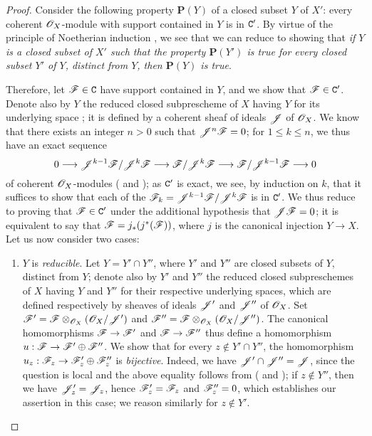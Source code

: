 \begin{proof}
\label{proof-3.3.1.2}
Consider the following property $\textbf{P}(Y)$ of a closed subset $Y$ of $X'$: every coherent $\mathscr{O}_X$-module with support contained in $Y$ is in $\mathtt{C}'$.
By virtue of the principle of Noetherian induction , we see that we can reduce to showing that \emph{if $Y$ is a closed subset of $X'$ such that the property $\textbf{P}(Y')$ is true for every closed subset $Y'$ of $Y$, distinct from $Y$, then $\textbf{P}(Y)$ is true}.

Therefore, let $\mathscr{F}\in\mathtt{C}$ have support contained in $Y$, and we show that $\mathscr{F}\in\mathtt{C}'$.
Denote also by $Y$ the reduced closed subprescheme of $X$ having $Y$ for its underlying space ; it is defined by a coherent sheaf of ideals $\mathscr{J}$ of $\mathscr{O}_X$.
We know  that there exists an integer $n>0$ such that $\mathscr{J}^n\mathscr{F}=0$; for $1\leq k\leq n$, we thus have an exact sequence
\[
  0\to\sh{J}^{k-1}\sh{F}/\sh{J}^k\sh{F}\to\sh{F}/\sh{J}^k\sh{F}\to\sh{F}/\sh{J}^{k-1}\sh{F}\to 0
\]
 of coherent $\mathscr{O}_X$-modules ( and ); as $\mathtt{C}'$ is exact, we see, by induction on $k$, that it suffices to show that each of the $\mathscr{F}_k=\mathscr{J}^{k-1}\mathscr{F}/\mathscr{J}^k\mathscr{F}$ is in $\mathtt{C}'$.
We thus reduce to proving that $\mathscr{F}\in\mathtt{C}'$ under the additional hypothesis that $\mathscr{J}\mathscr{F}=0$; it is equivalent to say that $\mathscr{F}=j_*(j^*(\mathscr{F}))$, where $j$ is the canonical injection $Y\to X$.
Let us now consider two cases:
\begin{enumerate}[label=(\alph*)]
  \item $Y$ is \emph{reducible}.
    Let $Y=Y'\cap Y''$, where $Y'$ and $Y''$ are closed subsets of $Y$, distinct from $Y$; denote also by $Y'$ and $Y''$ the reduced closed subpreschemes of $X$ having $Y$ and $Y''$ for their respective underlying spaces, which are defined respectively by sheaves of ideals $\mathscr{J}'$ and $\mathscr{J}''$ of $\mathscr{O}_X$.
    Set $\mathscr{F}'=\mathscr{F}\otimes_{\mathscr{O}_X}(\mathscr{O}_X/\mathscr{J}')$ and $\mathscr{F}''=\mathscr{F}\otimes_{\mathscr{O}_X}(\mathscr{O}_X/\mathscr{J}'')$.
    The canonical homomorphisms $\sh{F}\to\sh{F}'$ and $\sh{F}\to\sh{F}''$ thus define a homomorphism $u:\sh{F}\to\sh{F}'\oplus\sh{F}''$.
    We show that for every $z\not\in Y'\cap Y''$, the homomorphism $u_z:\sh{F}_z\to\sh{F}_z'\oplus\sh{F}_z''$ is \emph{bijective}.
    Indeed, we have $\mathscr{J}'\cap\mathscr{J}''=\mathscr{J}$, since the question is local and
    the above equality follows from ( and ); if $z\not\in Y''$, then we have $\mathscr{J}_z'=\mathscr{J}_z$, hence $\mathscr{F}_z'=\mathscr{F}_z$ and $\mathscr{F}_z''=0$, which establishes our assertion in this case; we reason similarly for $z\not\in Y'$.

\end{enumerate}
\end{proof}

